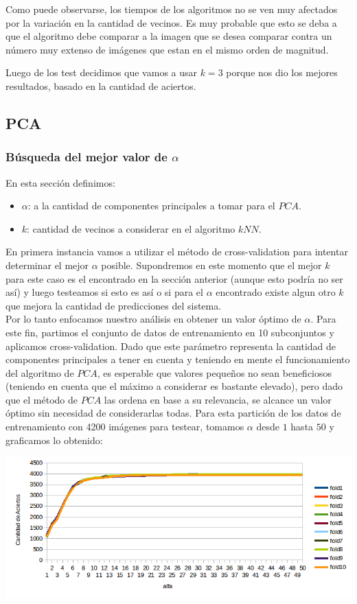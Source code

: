 Como puede observarse, los tiempos de los algoritmos no se ven muy afectados por la variación en la cantidad de vecinos. Es muy probable que esto se deba a que el algoritmo debe comparar a la imagen que se desea comparar contra un número muy extenso de imágenes que estan en el mismo orden de magnitud.

Luego de los test decidimos que vamos a usar $k=3$ porque nos dio los mejores resultados, basado en la  cantidad de aciertos.

\subsection{PCA}
\subsubsection{Búsqueda del mejor valor de $\alpha$}
En esta sección definimos:
\begin{itemize}
	\item $\alpha$: a la cantidad de componentes principales a tomar para el $PCA$.
	\item $k$: cantidad de vecinos a considerar en el algoritmo $kNN$.
\end{itemize}
En primera instancia vamos a utilizar el método de cross-validation para intentar determinar el mejor $\alpha$ posible. Supondremos en este momento que el mejor $k$ para este caso es el encontrado en la sección anterior (aunque esto podría no ser así) y luego testeamos si esto es así o si para el $\alpha$ encontrado existe algun otro $k$ que mejora la cantidad de predicciones del sistema.
\\
Por lo tanto enfocamos nuestro análisis en obtener un valor óptimo de $\alpha$. Para este fin, partimos el conjunto de datos de entrenamiento en 10 subconjuntos y aplicamos cross-validation. Dado que este parámetro representa la cantidad de componentes principales a tener en cuenta y teniendo en mente el funcionamiento del algoritmo de $PCA$, es esperable que valores pequeños no sean beneficiosos (teniendo en cuenta que el máximo a considerar es bastante elevado), pero dado que el método de $PCA$ las ordena en base a su relevancia, se alcance un valor óptimo sin necesidad de considerarlas todas. Para esta partición de los datos de entrenamiento con 4200 imágenes para testear, tomamos $\alpha$ desde $1$ hasta $50$ y graficamos lo obtenido:

\begin{center}
\includegraphics[scale=0.6]{nuevosResultados/pca/alfa/1.png}
\end{center}

